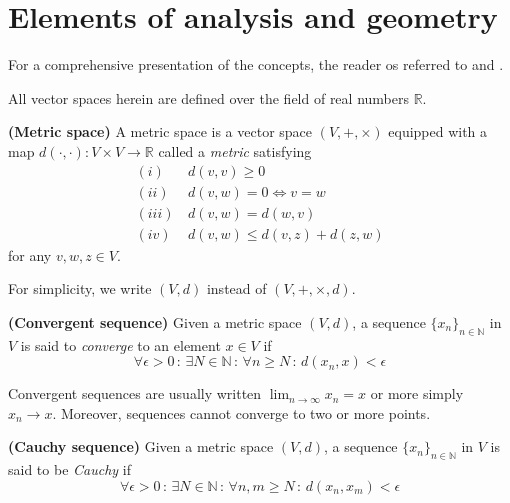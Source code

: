 \appendix

\chapter{Elements of analysis and geometry}
\label{app.elements_analysis_algebra}

For a comprehensive presentation of the concepts, the reader os referred to \cite{searcoid2002elements} and \cite{pugh2002real}. 

All vector spaces herein are defined over the field of real numbers $\mathbb{R}$.

\begin{definition}
	\textbf{(Metric space)}
	A metric space is a vector space $(V,+,\times)$ equipped with a map $d(\cdot,\cdot):V \times V \rightarrow \mathbb{R}$ called a \textit{metric} satisfying
	\begin{align}
		(i) \, &d(v,v) \geq 0 \\
		(ii) \, &d(v,w) = 0 \Leftrightarrow v = w\\
		(iii) \, &d(v,w) = d(w,v) \\
		(iv) \, &d(v,w) \leq d(v,z) + d(z,w)
	\end{align}
	for any $v,w,z \in V$.
\end{definition}

For simplicity, we write $(V,d)$ instead of $(V,+,\times,d)$.

\begin{definition}
	\textbf{(Convergent sequence)}
	Given a metric space $(V,d)$, a sequence $\{x_n\}_{n\in\mathbb{N}}$ in $V$ is said to \textit{converge} to an element $x \in V$ if
	\begin{equation}
		\forall \epsilon > 0 \, : \, \exists N \in \mathbb{N} \, : \,  \forall n \geq N \, : \, d(x_n, x) < \epsilon
	\end{equation}
\end{definition}

Convergent sequences are usually written $\lim_{n \rightarrow \infty} x_n = x$ or more simply $x_n \rightarrow x$. Moreover, sequences cannot converge to two or more points.

\begin{definition}
	\textbf{(Cauchy sequence)}
	Given a metric space $(V,d)$, a sequence $\{x_n\}_{n\in\mathbb{N}}$ in $V$ is said to be \textit{Cauchy} if
	\begin{equation}
		\forall \epsilon > 0 \, : \, \exists N \in \mathbb{N} \, : \,  \forall n,m \geq N \, : \, d(x_n, x_m) < \epsilon
	\end{equation}
\end{definition}

